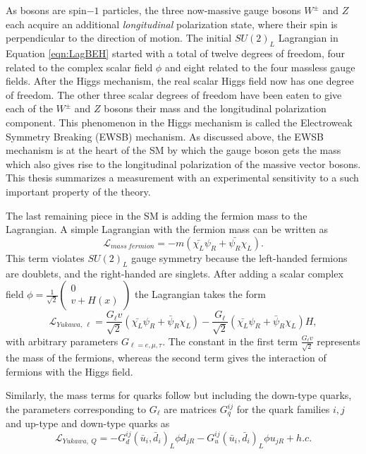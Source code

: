 As bosons are spin$-1$ particles, the three now-massive gauge bosons $W^{\pm}$ and $Z$ each acquire an additional \textit{longitudinal} polarization state, where their spin is perpendicular to the direction of motion. The initial $SU(2)_{L}$ Lagrangian in Equation \ref{eqn:LagBEH} started with a total of twelve degrees of freedom, four related to the complex scalar field $\phi$ and eight related to the four massless gauge fields. After the Higgs mechanism, the real scalar Higgs field now has one degree of freedom. The other three scalar degrees of freedom have been eaten to give each of the $W^{\pm}$ and $Z$ bosons their mass and the longitudinal polarization component. This phenomenon in the Higgs mechanism is called the Electroweak Symmetry Breaking (EWSB) mechanism. As discussed above, the EWSB mechanism is at the heart of the SM by which the gauge boson gets the mass which also gives rise to the longitudinal polarization of the massive vector bosons. This thesis summarizes a measurement with an experimental sensitivity to a such important property of the theory.

The last remaining piece in the SM is adding the fermion mass to the Lagrangian. A simple Lagrangian with the fermion mass can be written as 
\begin{equation}
\mathcal{L}_{mass~fermion} = -m(\bar{\chi_{L}}\psi_{R} + \bar{\psi_{R}}\chi_{L}).
\label{eqn:FermMass}
\end{equation}
This term violates $SU(2)_{L}$ gauge symmetry because the left-handed fermions are doublets, and the right-handed are singlets. After adding a scalar complex field $\phi =\frac{1}{\sqrt{2}} \begin{pmatrix} 0 \\ v+ H(x) \end{pmatrix}$ the Lagrangian takes the form 
\begin{equation}
\mathcal{L}_{Yukawa,~\ell} = \frac{G_{\ell}v}{\sqrt{2}} (\bar{\chi_{L}}\psi_{R} + \bar{\psi}_{R}\chi_{L} ) - \frac{G_{\ell}}{\sqrt{2}} (\bar{\chi_{L}}\psi_{R} + \bar{\psi}_{R}\chi_{L} )H,
\label{eqn:YukawaLepMass}
\end{equation}
with arbitrary parameters $G_{\ell =e,\mu,\tau}$. The constant in the first term $\frac{G_{\ell}v}{\sqrt{2}}$ represents the mass of the fermions, whereas the second term gives the interaction of fermions with the Higgs field. 

Similarly, the mass terms for quarks follow but including the down-type quarks, the parameters corresponding to $G_{\ell}$ are matrices $G^{ij}_{q}$ for the quark families $i,j$ and up-type and down-type quarks as
\begin{equation}
\mathcal{L}_{Yukawa,~Q} = -G^{ij}_{d}(\bar{u}_{i} , \bar{d}_{i} )_{L} \phi d_{jR} - G^{ij}_{u}(\bar{u}_{i} , \bar{d}_{i} )_{L} \phi u_{jR} + h.c.
\label{eqn:YukawaQuarkMass}
\end{equation}

